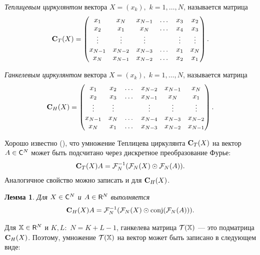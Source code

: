 \documentclass[12pt, specialist, subf,href,colorlinks=true,substylefile = spbu.rtx]{disser}
\newtheorem{lemma}{Лемма}
\theoremstyle{remark}
\theoremstyle{definition}
\begin{document}
\emph{Теплицевым циркулянтом} вектора $X=(x_k),$ $k = 1, \ldots, N$, называется матрица
\begin{equation*}
\mathbf{C}_T(X) = \begin{pmatrix}
x_1 & x_N & x_{N-1} & \dots & x_3 & x_2 \\ 
x_2 & x_1 & x_N & \dots & x_4 & x_3 \\ 
\vdots & \vdots & \vdots &  & \vdots & \vdots \\ 
x_{N-1} & x_{N-2} & x_{N-3} & \dots & x_1 & x_N \\ 
x_N & x_{N-1} & x_{N-2} & \dots & x_2 & x_1
\end{pmatrix}.
\end{equation*}

\emph{Ганкелевым циркулянтом} вектора $X=(x_k),$ $k = 1, \ldots, N$, называется матрица
\begin{equation*}
\mathbf{C}_H(X) = \begin{pmatrix}
x_1 & x_2 & \dots & x_{N-2} & x_{N-1} & x_N \\ 
x_2 & x_3 & \dots & x_{N-1} & x_N & x_1 \\ 
\vdots & \vdots &  & \vdots  & \vdots & \vdots \\ 
x_{N-1} & x_N & \dots & x_{N-4} & x_{N-3} & x_{N-2} \\ 
x_N & x_1 & \dots & x_{N-3} & x_{N-2} & x_{N-1}
\end{pmatrix}.
\end{equation*}

Хорошо известно (\cite{Korobeynikov2010}), что умножение Теплицева циркулянта $\mathbf{C}_T(X)$ на вектор $A \in \mathsf{C}^N$ может быть подсчитано через дискретное преобразование Фурье:
\begin{equation*}
\mathbf{C}_T(X) A = \mathcal{F}_N^{-1}(\mathcal{F}_N(X) \odot \mathcal{F}_N(A)).
\end{equation*}
Аналогичное свойство можно записать и для $\mathbf{C}_H(X)$.
\begin{lemma}{\cite{Golyandina2013a}}
	Для $X \in \mathsf{C}^N$ и $A \in \mathsf{R}^N$ выполняется
	\begin{equation*}
	\mathbf{C}_H(X) A = \mathcal{F}_N^{-1}(\mathcal{F}_N(X) \odot \text{conj}(\mathcal{F}_N(A))).
	\end{equation*}
\end{lemma}

Для $\mathbb{X} \in \mathsf{R}^N$ и $K, L:$ $N = K + L - 1$, ганкелева матрица $\mathcal{T}(\mathbb{X})$ --- это подматрица $\mathbf{C}_H(X)$. Поэтому, умножение $\mathcal{T}(\mathbb{X})$ на вектор может быть записано в следующем виде:
\end{document}
